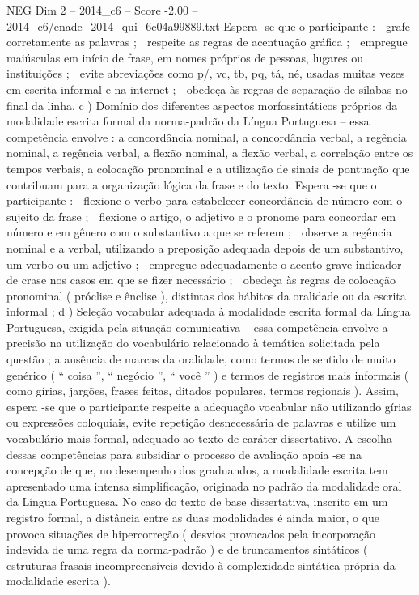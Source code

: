 \begin{textsample}{NEG Dim 2 – 2014\_c6 – Score -2.00 – 2014\_c6/enade\_2014\_qui\_6c04a99889.txt}
Espera -se que o participante :  grafe corretamente as palavras ;  respeite as regras de acentuação gráfica ;  empregue maiúsculas em início de frase, em nomes próprios de pessoas, lugares ou instituições ;  evite abreviações como p/, vc, tb, pq, tá, né, usadas muitas vezes em escrita informal e na internet ;  obedeça às regras de separação de sílabas no final da linha. c ) Domínio dos diferentes aspectos morfossintáticos próprios da modalidade escrita formal da norma-padrão da Língua Portuguesa – essa competência envolve : a concordância nominal, a concordância verbal, a regência nominal, a regência verbal, a flexão nominal, a flexão verbal, a correlação entre os tempos verbais, a colocação pronominal e a utilização de sinais de pontuação que contribuam para a organização lógica da frase e do texto.
Espera -se que o participante :  flexione o verbo para estabelecer concordância de número com o sujeito da frase ;  flexione o artigo, o adjetivo e o pronome para concordar em número e em gênero com o substantivo a que se referem ;  observe a regência nominal e a verbal, utilizando a preposição adequada depois de um substantivo, um verbo ou um adjetivo ;  empregue adequadamente o acento grave indicador de crase nos casos em que se fizer necessário ;  obedeça às regras de colocação pronominal ( próclise e ênclise ), distintas dos hábitos da oralidade ou da escrita informal ; d ) Seleção vocabular adequada à modalidade escrita formal da Língua Portuguesa, exigida pela situação comunicativa – essa competência envolve a precisão na utilização do vocabulário relacionado à temática solicitada pela questão ; a ausência de marcas da oralidade, como termos de sentido de muito genérico ( “ coisa ”, “ negócio ”, “ você ” ) e termos de registros mais informais ( como gírias, jargões, frases feitas, ditados populares, termos regionais ).
Assim, espera -se que o participante respeite a adequação vocabular não utilizando gírias ou expressões coloquiais, evite repetição desnecessária de palavras e utilize um vocabulário mais formal, adequado ao texto de caráter dissertativo.
A escolha dessas competências para subsidiar o processo de avaliação apoia -se na concepção de que, no desempenho dos graduandos, a modalidade escrita tem apresentado uma intensa simplificação, originada no padrão da modalidade oral da Língua Portuguesa.
No caso do texto de base dissertativa, inscrito em um registro formal, a distância entre as duas modalidades é ainda maior, o que provoca situações de hipercorreção ( desvios provocados pela incorporação indevida de uma regra da norma-padrão ) e de truncamentos sintáticos ( estruturas frasais incompreensíveis devido à complexidade sintática própria da modalidade escrita ).

\end{textsample}
